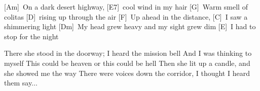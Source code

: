 [Am]\ On a dark desert highway, [E7]\ cool wind in my hair
[G]\ Warm smell of colitas [D]\ rising up through the air
[F]\ Up ahead in the distance, [C]\ I saw a shimmering light
[Dm]\ My head grew heavy and my sight grew dim
[E]\ I had to stop for the night

There she stood in the doorway;  I heard the mission bell
And I was thinking to myself 
This could be heaven or this could be hell
Then she lit up a candle, and she showed me the way
There were voices down the corridor, 
I thought I heard them say...
\esong
